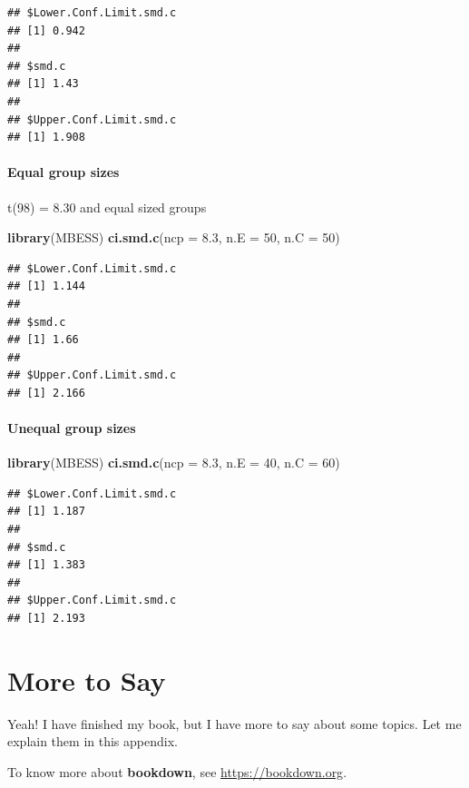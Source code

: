\documentclass[
]{krantz}
\makeatletter
\newenvironment{Shaded}{\begin{snugshade}}{\end{snugshade}}
\newcommand{\DataTypeTok}[1]{\textcolor[rgb]{0.27,0.27,0.27}{#1}}
\newcommand{\DecValTok}[1]{\textcolor[rgb]{0.06,0.06,0.06}{#1}}
\newcommand{\FloatTok}[1]{\textcolor[rgb]{0.06,0.06,0.06}{#1}}
\newcommand{\KeywordTok}[1]{\textcolor[rgb]{0.27,0.27,0.27}{\textbf{#1}}}
\newcommand{\NormalTok}[1]{#1}
\newenvironment{kframe}{%
\medskip{}
\setlength{\fboxsep}{.8em}
 \def\at@end@of@kframe{}%
 \ifinner\ifhmode%
  \def\at@end@of@kframe{\end{minipage}}%
  \begin{minipage}{\columnwidth}%
 \fi\fi%
 \def\FrameCommand##1{\hskip\@totalleftmargin \hskip-\fboxsep
 \colorbox{shadecolor}{##1}\hskip-\fboxsep
     \hskip-\linewidth \hskip-\@totalleftmargin \hskip\columnwidth}%
 \MakeFramed {\advance\hsize-\width
   \@totalleftmargin\z@ \linewidth\hsize
   \@setminipage}}%
 {\par\unskip\endMakeFramed%
 \at@end@of@kframe}
\renewenvironment{Shaded}{\begin{kframe}}{\end{kframe}}
\makeatother
\begin{document}
\begin{verbatim}
## $Lower.Conf.Limit.smd.c
## [1] 0.942
## 
## $smd.c
## [1] 1.43
## 
## $Upper.Conf.Limit.smd.c
## [1] 1.908
\end{verbatim}

\hypertarget{equal-group-sizes-1}{%
\subsubsection{Equal group sizes}\label{equal-group-sizes-1}}

t(98) = 8.30 and equal sized groups

\begin{Shaded}
\begin{Highlighting}[]
\KeywordTok{library}\NormalTok{(MBESS)}
\KeywordTok{ci.smd.c}\NormalTok{(}\DataTypeTok{ncp =} \FloatTok{8.3}\NormalTok{, }\DataTypeTok{n.E =} \DecValTok{50}\NormalTok{, }\DataTypeTok{n.C =} \DecValTok{50}\NormalTok{) }
\end{Highlighting}
\end{Shaded}

\begin{verbatim}
## $Lower.Conf.Limit.smd.c
## [1] 1.144
## 
## $smd.c
## [1] 1.66
## 
## $Upper.Conf.Limit.smd.c
## [1] 2.166
\end{verbatim}

\hypertarget{unequal-group-sizes-1}{%
\subsubsection{Unequal group sizes}\label{unequal-group-sizes-1}}

\begin{Shaded}
\begin{Highlighting}[]
\KeywordTok{library}\NormalTok{(MBESS)}
\KeywordTok{ci.smd.c}\NormalTok{(}\DataTypeTok{ncp =} \FloatTok{8.3}\NormalTok{, }\DataTypeTok{n.E =} \DecValTok{40}\NormalTok{, }\DataTypeTok{n.C =} \DecValTok{60}\NormalTok{) }
\end{Highlighting}
\end{Shaded}

\begin{verbatim}
## $Lower.Conf.Limit.smd.c
## [1] 1.187
## 
## $smd.c
## [1] 1.383
## 
## $Upper.Conf.Limit.smd.c
## [1] 2.193
\end{verbatim}

\cleardoublepage

\hypertarget{appendix-appendix}{%
\appendix {}}


\hypertarget{more-to-say}{%
\chapter{More to Say}\label{more-to-say}}

Yeah! I have finished my book, but I have more to say about some topics. Let me explain them in this appendix.

To know more about \textbf{bookdown}, see \url{https://bookdown.org}.

  

\backmatter
\printindex
\end{document}
